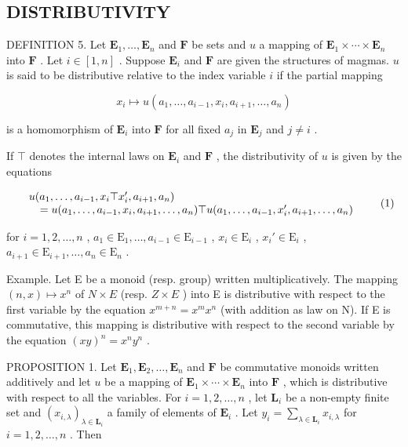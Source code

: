 \subsection{DISTRIBUTIVITY}

DEFINITION 5. Let \(\mathbf{E}_1, \ldots, \mathbf{E}_n\) and \(\mathbf{F}\) be sets and \(u\) a mapping of \(\mathbf{E}_1 \times \cdots \times \mathbf{E}_n\) into \(\mathbf{F}\) . Let \(i \in [1, n]\) . Suppose \(\mathbf{E}_i\) and \(\mathbf{F}\) are given the structures of magmas. \(u\) is said to be distributive relative to the index variable \(i\) if the partial mapping

\[
x _ {i} \mapsto u (a _ {1}, \dots , a _ {i - 1}, x _ {i}, a _ {i + 1}, \dots , a _ {n})
\]

is a homomorphism of \(\mathbf{E}_i\) into \(\mathbf{F}\) for all fixed \(a_j\) in \(\mathbf{E}_j\) and \(j \neq i\) .

If \(\top\) denotes the internal laws on \(\mathbf{E}_i\) and \(\mathbf{F}\) , the distributivity of \(u\) is given by the equations

\[
\begin{array}{r l} & u (a _ {1}, \dots , a _ {i - 1}, x _ {i} \top x _ {i} ^ {\prime}, a _ {i + 1}, a _ {n}) \\ & \quad = u (a _ {1}, \dots , a _ {i - 1}, x _ {i}, a _ {i + 1}, \dots , a _ {n}) \top u (a _ {1}, \dots , a _ {i - 1}, x _ {i} ^ {\prime}, a _ {i + 1}, \dots , a _ {n}) \end{array}\tag{1}
\]

for \(i = 1, 2, \ldots, n\) , \(a_1 \in \mathrm{E}_1, \ldots, a_{i-1} \in \mathrm{E}_{i-1}\) , \(x_i \in \mathrm{E}_i\) , \(x_i' \in \mathrm{E}_i\) , \(a_{i+1} \in \mathrm{E}_{i+1}, \ldots, a_n \in \mathrm{E}_n\) .

Example. Let E be a monoid (resp. group) written multiplicatively. The mapping \((n, x) \mapsto x^{n}\) of \(N \times E\) (resp. \(Z \times E\) ) into E is distributive with respect to the first variable by the equation \(x^{m+n} = x^{m}x^{n}\) (with addition as law on N). If E is commutative, this mapping is distributive with respect to the second variable by the equation \((xy)^{n} = x^{n}y^{n}\) .

PROPOSITION 1. Let \(\mathbf{E}_1, \mathbf{E}_2, \ldots, \mathbf{E}_n\) and \(\mathbf{F}\) be commutative monoids written additively and let \(u\) be a mapping of \(\mathbf{E}_1 \times \cdots \times \mathbf{E}_n\) into \(\mathbf{F}\) , which is distributive with respect to all the variables. For \(i = 1, 2, \ldots, n\) , let \(\mathbf{L}_i\) be a non-empty finite set and \((x_{i,\lambda})_{\lambda \in \mathbf{L}_i}\) a family of elements of \(\mathbf{E}_i\) . Let \(y_i = \sum_{\lambda \in \mathbf{L}_i} x_{i,\lambda}\) for \(i = 1, 2, \ldots, n\) . Then

